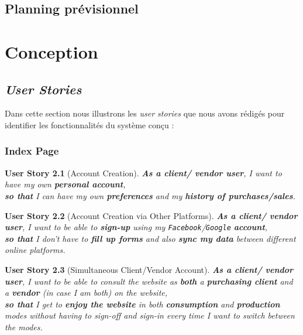 \documentclass[a4paper,12pt]{book}
\theoremstyle{break}
\newtheorem{userStory}{User Story}
\theoremstyle{break}
\theoremstyle{break}
\theoremstyle{break}
\theoremstyle{definition}
\theoremstyle{remark}
\begin{document}
\section{Planning prévisionnel}

\chapter{Conception}
\section{\textit{User Stories}}
Dans cette section nous illustrons les \textit{user stories} que nous avons rédigés pour identifier les fonctionnalités du système conçu :
\subsection{Index Page}
\begin{userStory}[Account Creation]
\textbf{As a {\color{green} client}/{\color{red} vendor} user}, I want to have my own \textbf{personal account},\\
\indent
\textbf{so that} I can have my own \textbf{preferences} and my \textbf{history of purchases/sales}.
\end{userStory}

\begin{userStory}[Account Creation via Other Platforms]
\textbf{As a {\color{green} client}/{\color{red} vendor} user}, I want to be able to \textbf{sign-up} using my \texttt{Facebook}/\texttt{Google} \textbf{account},\\
\indent
\textbf{so that} I don't have to \textbf{fill up forms} and also \textbf{sync my data} between different online platforms.
\end{userStory}

\begin{userStory}[Simultaneous Client/Vendor Account]
\textbf{As a {\color{green} client}/{\color{red} vendor} user}, I want to be able to consult the website as \textbf{both} a \textbf{purchasing client} and a \textbf{vendor} (in case I am both) on the website,\\
\indent
\textbf{so that} I get to \textbf{enjoy the website} in both \textbf{consumption} and \textbf{production} modes without having to sign-off and sign-in every time I want to switch between the modes.
\end{userStory}
\end{document}
